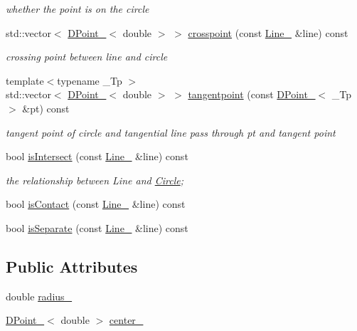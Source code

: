 \begin{DoxyCompactItemize}
\begin{DoxyCompactList}\small\item\em whether the point is on the circle \end{DoxyCompactList}\item 
std\-::vector$<$ \hyperlink{classnubot_1_1DPoint__}{D\-Point\-\_\-}$<$ double $>$ $>$ \hyperlink{classnubot_1_1Circle_a0f636f2fa233c4ea91c2bf76a5357e85}{crosspoint} (const \hyperlink{classnubot_1_1Line__}{Line\-\_\-} \&line) const 
\begin{DoxyCompactList}\small\item\em crossing point between line and circle \end{DoxyCompactList}\item 
{\footnotesize template$<$typename \-\_\-\-Tp $>$ }\\std\-::vector$<$ \hyperlink{classnubot_1_1DPoint__}{D\-Point\-\_\-}$<$ double $>$ $>$ \hyperlink{classnubot_1_1Circle_ae30b8af217855017e72b6ad27d97e0d8}{tangentpoint} (const \hyperlink{classnubot_1_1DPoint__}{D\-Point\-\_\-}$<$ \-\_\-\-Tp $>$ \&pt) const 
\begin{DoxyCompactList}\small\item\em tangent point of circle and tangential line pass through pt and tangent point \end{DoxyCompactList}\item 
bool \hyperlink{classnubot_1_1Circle_aaa9f7ac0951e42a9daf093e0b6b04a35}{is\-Intersect} (const \hyperlink{classnubot_1_1Line__}{Line\-\_\-} \&line) const 
\begin{DoxyCompactList}\small\item\em the relationship between Line and \hyperlink{classnubot_1_1Circle}{Circle}; \end{DoxyCompactList}\item 
bool \hyperlink{classnubot_1_1Circle_a42df665db5104645c7c7cbd509110553}{is\-Contact} (const \hyperlink{classnubot_1_1Line__}{Line\-\_\-} \&line) const 
\item 
bool \hyperlink{classnubot_1_1Circle_a86f0a0b3c09e8d4f0a63d7211b99c43f}{is\-Separate} (const \hyperlink{classnubot_1_1Line__}{Line\-\_\-} \&line) const 
\end{DoxyCompactItemize}
\subsection*{Public Attributes}
\begin{DoxyCompactItemize}
\item 
double \hyperlink{classnubot_1_1Circle_a64d442408c8cb47a97c31017976722bb}{radius\-\_\-}
\item 
\hyperlink{classnubot_1_1DPoint__}{D\-Point\-\_\-}$<$ double $>$ \hyperlink{classnubot_1_1Circle_aa65fe4a79dff4f07f6d024fa55edb6aa}{center\-\_\-}
\end{DoxyCompactItemize}


